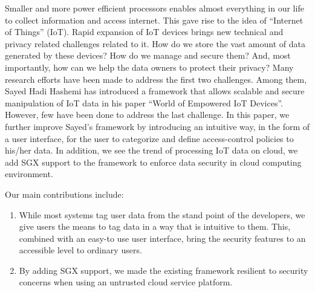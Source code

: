 Smaller and more power efficient processors enables almost everything in our life to collect information and access internet. This gave rise to the idea of “Internet of Things” (IoT). 
Rapid expansion of IoT devices brings new technical and privacy related challenges related to it. How do we store the vast amount of data generated by these devices? How do we manage and secure them? And, most importantly, how can we help the data owners to protect their privacy? Many research efforts have been made to address the first two challenges. Among them, Sayed Hadi Hashemi has introduced a framework that allows scalable and secure manipulation of IoT data in his paper “World of Empowered IoT Devices”. However, few have been done to address the last challenge. In this paper, we further improve Sayed’s framework by introducing an intuitive way, in the form of a user interface, for the user to categorize and define access-control policies to his/her data. In addition, we see the trend of processing IoT data on cloud, we add SGX support to the framework to enforce data security in cloud computing environment.

Our main contributions include:
\begin{enumerate}
	\item While most systems tag user data from the stand point of the developers, we give users the means to tag data in a way that is intuitive to them. This, combined with an easy-to use user interface, bring the security features to an accessible level to ordinary users.

	\item By adding SGX support, we made the existing framework resilient to security concerns when using an untrusted cloud service platform.
\end{enumerate}

